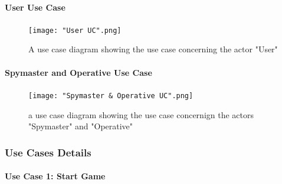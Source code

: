 \documentclass[10pt, a4paper]{article}
\begin{document}
	\paragraph{User Use Case}
	
	\begin{center}
		\begin{figure}[H]
			\caption{A use case diagram showing the use case concerning the actor "User"}
			\texttt{[image: "User UC".png]}
		\end{figure}
	\end{center} 
	
	\newpage
	
	\paragraph{Spymaster and Operative Use Case}
	
	\begin{center}
		\begin{figure}[H]
			\caption{a use case diagram showing the use case concernign the actors "Spymaster" and "Operative"}
			\texttt{[image: "Spymaster \& Operative UC".png]}
		\end{figure}
	\end{center}
	
	
	\subsubsection{Use Cases Details}
	
	\paragraph{Use Case 1: Start Game }
	
\end{document}
